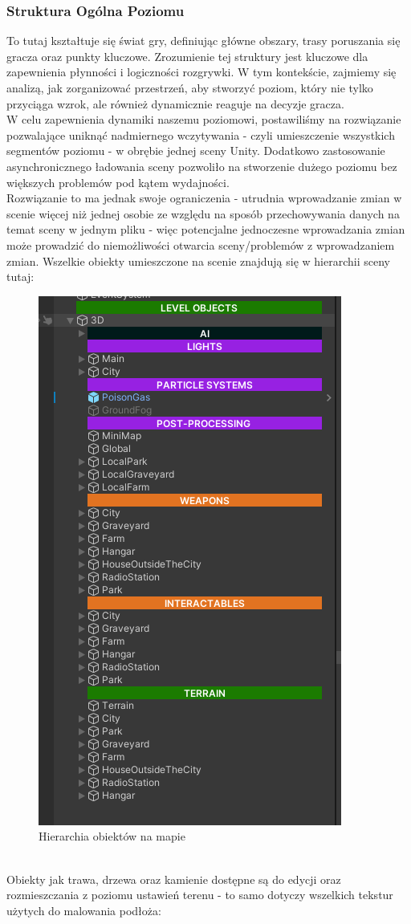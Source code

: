 \subsubsection{Struktura Ogólna Poziomu}
To tutaj kształtuje się świat gry, definiując główne obszary, trasy poruszania się gracza oraz punkty kluczowe. Zrozumienie tej struktury jest kluczowe dla zapewnienia płynności i logiczności rozgrywki. W tym kontekście, zajmiemy się analizą, jak zorganizować przestrzeń, aby stworzyć poziom, który nie tylko przyciąga wzrok, ale również dynamicznie reaguje na decyzje gracza.\\
W celu zapewnienia dynamiki naszemu poziomowi, postawiliśmy na rozwiązanie pozwalające uniknąć nadmiernego wczytywania - czyli umieszczenie wszystkich segmentów poziomu - w obrębie jednej sceny Unity.
Dodatkowo zastosowanie asynchronicznego ładowania sceny pozwoliło na stworzenie dużego poziomu bez większych problemów pod kątem wydajności.\\
Rozwiązanie to ma jednak swoje ograniczenia - utrudnia wprowadzanie zmian w scenie więcej niż jednej osobie ze względu na sposób przechowywania danych na temat sceny w jednym pliku - więc potencjalne jednoczesne wprowadzania zmian może prowadzić do niemożliwości otwarcia sceny/problemów z wprowadzaniem zmian.
Wszelkie obiekty umieszczone na scenie znajdują się w hierarchii sceny tutaj:\\
\begin{figure}[h!]
    \centering
    \includegraphics[width=0.41\linewidth]{Images/lvlhierarchy.png}
    \caption{Hierarchia obiektów na mapie}
    \label{fig:lvlhierarchy}
\end{figure}
\\Obiekty jak trawa, drzewa oraz kamienie dostępne są do edycji oraz rozmieszczania z poziomu ustawień terenu - to samo dotyczy wszelkich tekstur użytych do malowania podłoża:
